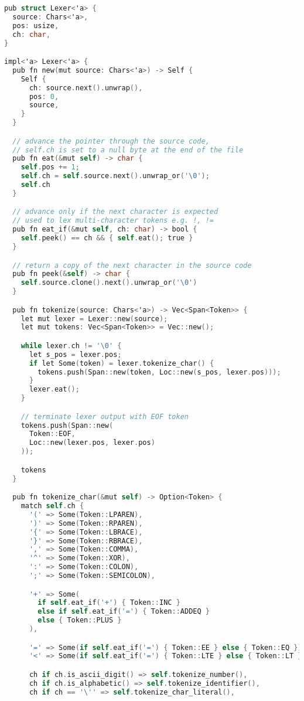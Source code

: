 \begin{lstlisting}[language=C]
pub struct Lexer<'a> {
  source: Chars<'a>,
  pos: usize,
  ch: char,
}

impl<'a> Lexer<'a> {
  pub fn new(mut source: Chars<'a>) -> Self {
    Self {
      ch: source.next().unwrap(),
      pos: 0,
      source,
    }
  }

  // advance the pointer through the source code, 
  // self.ch is set to a null byte at the end of the file
  pub fn eat(&mut self) -> char {
    self.pos += 1;
    self.ch = self.source.next().unwrap_or('\0');
    self.ch
  }

  // advance only if the next character is expected
  // used to lex multi-character tokens e.g. !, !=
  pub fn eat_if(&mut self, ch: char) -> bool {
    self.peek() == ch && { self.eat(); true }
  }

  // return a copy of the next character in the source code
  pub fn peek(&self) -> char {
    self.source.clone().next().unwrap_or('\0')
  }

  pub fn tokenize(source: Chars<'a>) -> Vec<Span<Token>> {
    let mut lexer = Lexer::new(source);
    let mut tokens: Vec<Span<Token>> = Vec::new();

    while lexer.ch != '\0' {
      let s_pos = lexer.pos;
      if let Some(token) = lexer.tokenize_char() {
        tokens.push(Span::new(token, Loc::new(s_pos, lexer.pos)));
      }
      lexer.eat();
    }

    // terminate lexer output with EOF token
    tokens.push(Span::new(
      Token::EOF,
      Loc::new(lexer.pos, lexer.pos)
    ));

    tokens
  }

  pub fn tokenize_char(&mut self) -> Option<Token> {
    match self.ch {
      '(' => Some(Token::LPAREN),
      ')' => Some(Token::RPAREN),
      '{' => Some(Token::LBRACE),
      '}' => Some(Token::RBRACE),
      ',' => Some(Token::COMMA),
      '^' => Some(Token::XOR),
      ':' => Some(Token::COLON),
      ';' => Some(Token::SEMICOLON),

      '+' => Some(
        if self.eat_if('+') { Token::INC } 
        else if self.eat_if('=') { Token::ADDEQ } 
        else { Token::PLUS }
      ),

      '=' => Some(if self.eat_if('=') { Token::EE } else { Token::EQ }),
      '<' => Some(if self.eat_if('=') { Token::LTE } else { Token::LT }),

      ch if ch.is_ascii_digit() => self.tokenize_number(),
      ch if ch.is_alphabetic() => self.tokenize_identifier(),
      ch if ch == '\'' => self.tokenize_char_literal(),


\end{lstlisting}

